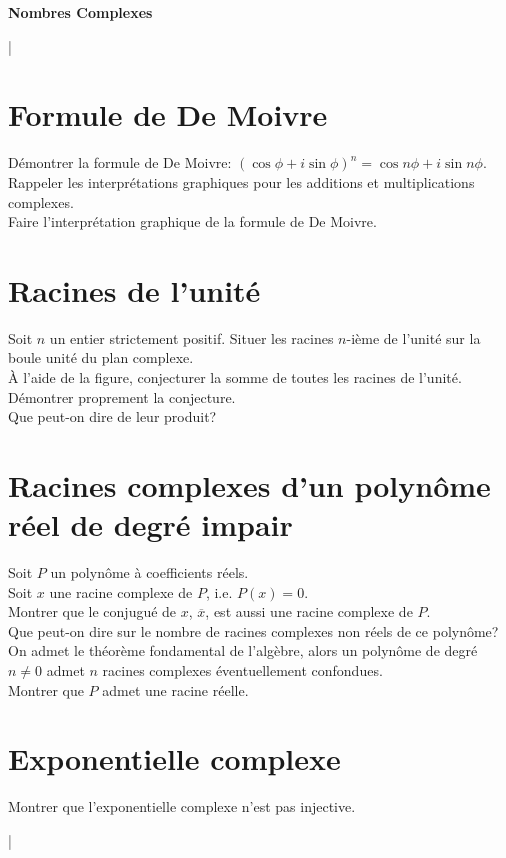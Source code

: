 \documentclass{article}
\begin{document}
\renewcommand\partname{Partie}

\begin{center}
\Huge{\textbf{Nombres Complexes}}
\end{center}
\begin{center}
|\\
\end{center}
\section{Formule de De Moivre}
D\'emontrer la formule de De Moivre: $(\cos\phi+i\sin\phi)^n=\cos n\phi+i\sin n\phi$.\\
Rappeler les interpr\'etations graphiques pour les additions et multiplications complexes.\\
Faire l'interpr\'etation graphique de la formule de De Moivre.
\section{Racines de l'unit\'e}
Soit $n$ un entier strictement positif. Situer les racines $n$-i\`eme de l'unit\'e sur la boule unit\'e du plan complexe.\\
\`A l'aide de la figure, conjecturer la somme de toutes les racines de l'unit\'e.\\
D\'emontrer proprement la conjecture.\\
Que peut-on dire de leur produit?
\section{Racines complexes d'un polyn\^ome r\'eel de degr\'e impair}
Soit $P$ un polyn\^ome \`a coefficients r\'eels.\\
Soit $x$ une racine complexe de $P$, i.e. $P(x)=0$.\\
Montrer que le conjugu\'e de $x$, $\overline{x}$, est aussi une racine complexe de $P$.\\
Que peut-on dire sur le nombre de racines complexes non r\'eels de ce polyn\^ome?\\
On admet le th\'eor\`eme fondamental de l'alg\`ebre, alors un polyn\^ome de degr\'e $n\neq 0$ admet $n$ racines complexes \'eventuellement confondues.\\
Montrer que $P$ admet une racine r\'eelle.
\section{Exponentielle complexe}
Montrer que l'exponentielle complexe n'est pas injective.
\begin{center}
|\\
\end{center}
\end{document}
